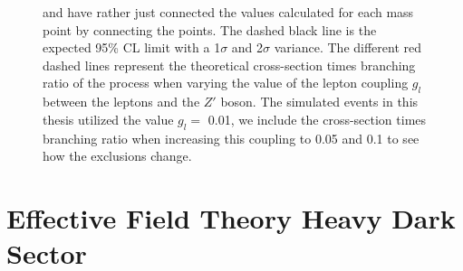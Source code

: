 \documentclass[12pt, a4paper]{book}
\begin{document}
\begin{figure}[!ht]
{   and have rather just connected the values calculated for each mass point by connecting the points. The dashed black line is the expected 95\% CL limit with a 1$\sigma$ and 2$\sigma$ variance. 
   The different red dashed lines represent the theoretical cross-section times branching ratio of the process when varying the value of the lepton coupling $g_l$ between the leptons and the $Z'$ boson. The simulated events in this thesis utilized the value $g_l=$ 0.01, we include the cross-section times branching ratio when increasing this coupling to 0.05 and 0.1 to see how the exclusions change.  }\label{fig:LV_LDS_me_SRS}
\end{figure}


\clearpage
\section{Effective Field Theory Heavy Dark Sector}
\end{document}

